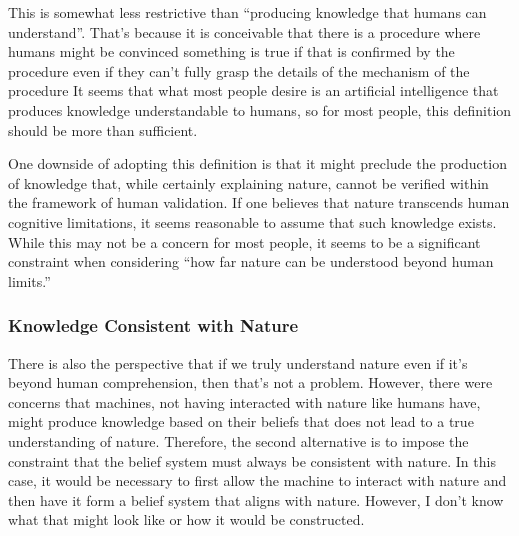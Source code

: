 This is somewhat less restrictive than ``producing knowledge that humans can understand''. That's because it is conceivable that there is a procedure where humans might be convinced something is true if that is confirmed by the procedure even if they can't fully grasp the details of the mechanism of the procedure It seems that what most people desire is an artificial intelligence that produces knowledge understandable to humans, so for most people, this definition should be more than sufficient.

One downside of adopting this definition is that it might preclude the production of knowledge that, while certainly explaining nature, cannot be verified within the framework of human validation. If one believes that nature transcends human cognitive limitations, it seems reasonable to assume that such knowledge exists. While this may not be a concern for most people, it seems to be a significant constraint when considering ``how far nature can be understood beyond human limits.''


\subsubsection{Knowledge Consistent with Nature}
There is also the perspective that if we truly understand nature even if it's beyond human comprehension, then that's not a problem. However, there were concerns that machines, not having interacted with nature like humans have, might produce knowledge based on their beliefs that does not lead to a true understanding of nature. Therefore, the second alternative is to impose the constraint that the belief system must always be consistent with nature. In this case, it would be necessary to first allow the machine to interact with nature and then have it form a belief system that aligns with nature. However, I don't know what that might look like or how it would be constructed.

